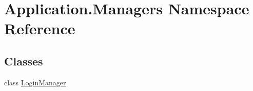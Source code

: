 \hypertarget{namespace_application_1_1_managers}{}\section{Application.\+Managers Namespace Reference}
\label{namespace_application_1_1_managers}
\subsection*{Classes}
\begin{DoxyCompactItemize}
\item 
class \mbox{\hyperlink{class_application_1_1_managers_1_1_login_manager}{Login\+Manager}}
\end{DoxyCompactItemize}
